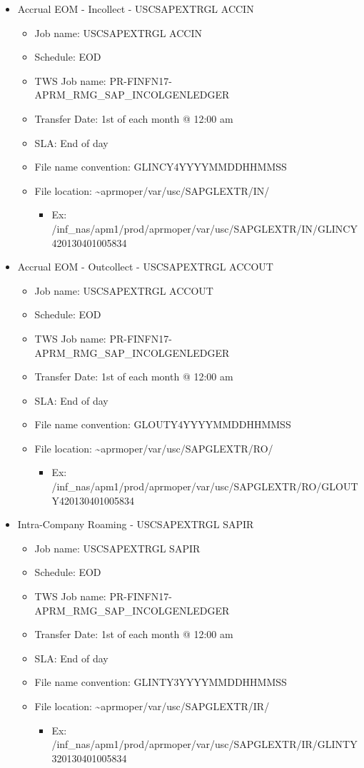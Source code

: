 \documentclass[12pt,twoside]{article}
\begin{document}
\begin{itemize}
\item Accrual EOM - Incollect - USCSAPEXTRGL ACCIN
\begin{itemize}
\item Job name: USCSAPEXTRGL ACCIN
\item Schedule: EOD
\item TWS Job name: PR-FINFN17-APRM\_RMG\_SAP\_INCOLGENLEDGER
\item Transfer Date: 1st of each month @ 12:00 am
\item SLA: End of day
\item File name convention: GLINCY4YYYYMMDDHHMMSS
\item File location: \textasciitilde{}aprmoper/var/usc/SAPGLEXTR/IN/
\begin{itemize}
\item Ex: /inf\_nas/apm1/prod/aprmoper/var/usc/SAPGLEXTR/IN/GLINCY420130401005834
\end{itemize}
\end{itemize}

\item Accrual EOM - Outcollect - USCSAPEXTRGL ACCOUT
\begin{itemize}
\item Job name: USCSAPEXTRGL ACCOUT
\item Schedule: EOD
\item TWS Job name: PR-FINFN17-APRM\_RMG\_SAP\_INCOLGENLEDGER
\item Transfer Date: 1st of each month @ 12:00 am
\item SLA: End of day
\item File name convention: GLOUTY4YYYYMMDDHHMMSS
\item File location: \textasciitilde{}aprmoper/var/usc/SAPGLEXTR/RO/
\begin{itemize}
\item Ex:  /inf\_nas/apm1/prod/aprmoper/var/usc/SAPGLEXTR/RO/GLOUTY420130401005834
\end{itemize}
\end{itemize}

\item Intra-Company Roaming - USCSAPEXTRGL SAPIR
\begin{itemize}
\item Job name: USCSAPEXTRGL SAPIR
\item Schedule: EOD
\item TWS Job name: PR-FINFN17-APRM\_RMG\_SAP\_INCOLGENLEDGER
\item Transfer Date: 1st of each month @ 12:00 am
\item SLA: End of day
\item File name convention: GLINTY3YYYYMMDDHHMMSS
\item File location: \textasciitilde{}aprmoper/var/usc/SAPGLEXTR/IR/
\begin{itemize}
\item Ex:  /inf\_nas/apm1/prod/aprmoper/var/usc/SAPGLEXTR/IR/GLINTY320130401005834
\end{itemize}
\end{itemize}
\end{itemize}
\normalsize
\end{document}
